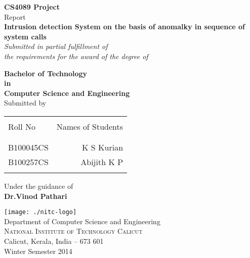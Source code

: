 \begin{titlepage}

\begin{center}

\textup{\small {\bf CS4089 Project} \\ Report}\\[0.2in]

\Large \textbf {Intrusion detection System on the basis of anomalky in sequence of system calls}\\[0.5in]

       \small \emph{Submitted in partial fulfillment of\\
        the requirements for the award of the degree of}
        \vspace{.2in}

       {\bf Bachelor of Technology \\in\\ Computer Science and Engineering}\\[0.5in]

\normalsize Submitted by \\
\begin{table}[h]
\centering
\begin{tabular}{lr}\hline \\
Roll No & Names of Students \\ \\ \hline
\\
B100045CS & K S Kurian \\
B100257CS & Abijith K P \\ \\ \hline 
\end{tabular}
\end{table}

\vspace{.1in}
Under the guidance of\\
{\textbf{Dr.Vinod Pathari}}\\[0.2in]

\vfill

\texttt{[image: ./nitc-logo]}\\[0.1in]
\Large{Department of Computer Science and Engineering}\\
\normalsize
\textsc{National Institute of Technology Calicut}\\
Calicut, Kerala, India -- 673 601 \\
\vspace{0.2cm}
Winter Semester 2014

\end{center}

\end{titlepage}
